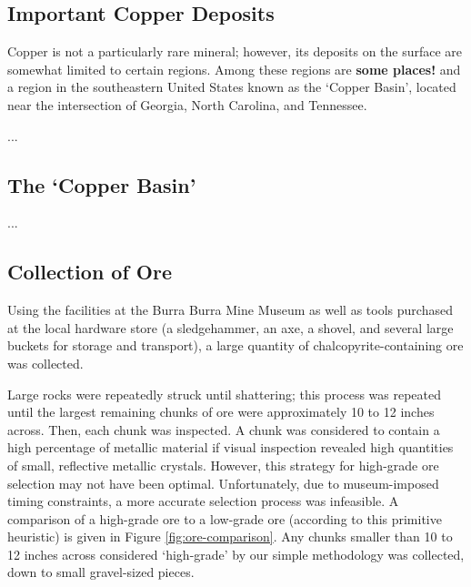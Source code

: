 


\subsection{Important Copper Deposits}

Copper is not a particularly rare mineral; however, its deposits on the surface
are somewhat limited to certain regions.  Among these regions are \textbf{some
places!} and a region in the southeastern United States known as the `Copper
Basin', located near the intersection of Georgia, North Carolina, and Tennessee.

...

\subsection{The `Copper Basin'}

...

\subsection{Collection of Ore}

Using the facilities at the Burra Burra Mine Museum as well as tools purchased
at the local hardware store (a sledgehammer, an axe, a shovel, and several large
buckets for storage and transport), a large quantity of chalcopyrite-containing
ore was collected.

Large rocks were repeatedly struck until shattering; this process was repeated
until the largest remaining chunks of ore were approximately 10 to 12 inches
across.  Then, each chunk was inspected.  A chunk was considered to contain a
high percentage of metallic material if visual inspection revealed high
quantities of small, reflective metallic crystals.  However, this strategy for
high-grade ore selection may not have been optimal.  Unfortunately, due to
museum-imposed timing constraints, a more accurate selection process was
infeasible.  A comparison of a high-grade ore to a low-grade ore (according to
this primitive heuristic) is given in Figure \ref{fig:ore-comparison}.  Any
chunks smaller than 10 to 12 inches across considered `high-grade' by our simple
methodology was collected, down to small gravel-sized pieces.

